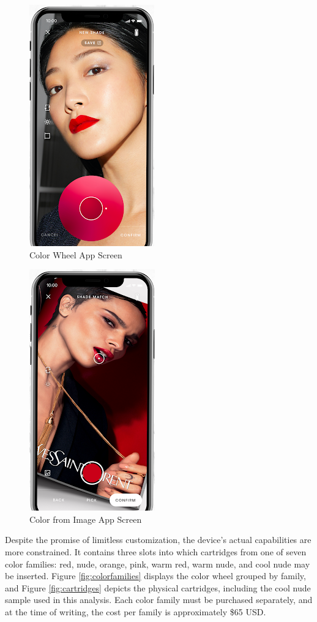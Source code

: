 \begin{figure}[H]
	\centering
	\includegraphics[scale=.7]{colorwheel}
	\caption{Color Wheel App Screen}
	\label{fig:colorwheel}
\end{figure}

\begin{figure}[H]
	\centering
	\includegraphics[scale=.7=]{colorselector}
	\caption{Color from Image App Screen}
	\label{fig:colorselector}
\end{figure}

Despite the promise of limitless customization, the device’s actual capabilities are more constrained. It contains three slots into which cartridges from one of seven color families: red, nude, orange, pink, warm red, warm nude, and cool nude may be inserted. Figure \ref{fig:colorfamilies} displays the color wheel grouped by family, and Figure \ref{fig:cartridges} depicts the physical cartridges, including the cool nude sample used in this analysis. Each color family must be purchased separately, and at the time of writing, the cost per family is approximately \$65 USD.

